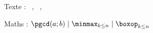 \documentclass[varwidth, border = 3pt]{standalone}
\newcommand\exasep{\kern3pt | \kern3pt}
\begin{document}
Texte :
\pgcd\ , \minmax\ , \boxop

Maths :
$\displaystyle
 \pgcd(a;b) \exasep \minmax_{k \le n} \exasep \boxop_{k \le n}$
\end{document}
